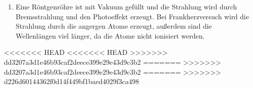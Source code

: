 \documentclass[11pt, a4paper]{article}
\begin{document}
\begin{enumerate}
        \item Eine Röntgenröhre ist mit Vakuum gefüllt und die Strahlung wird durch Bremsstrahlung und den Photoeffekt erzeugt. Bei Frankherzversuch wird die Strahlung durch die angergen Atome erzeugt, außerdem sind die Wellenlängen viel länger, da die Atome nicht ionisiert werden. 
        
        
    \end{enumerate}

        

<<<<<<< HEAD
<<<<<<< HEAD
>>>>>>> dd3207a3d1e46b93caf2deece399e29e43d9c3b2
=======
>>>>>>> dd3207a3d1e46b93caf2deece399e29e43d9c3b2
=======
>>>>>>> d226d60144362f0d14f449bf1baed4029f3ca498
    
    
\end{document}
